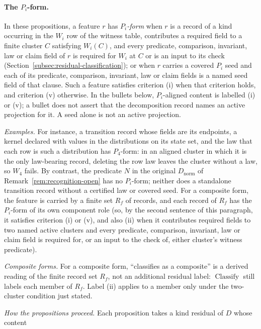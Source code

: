 \paragraph{The \(P_i\)-form.}\label{par:pi-form} In these propositions, a feature \(r\) has \emph{\(P_i\)-form} when \(r\) is a
record of a kind occurring in the \(W_i\) row of the witness table,
contributes a required field to a finite cluster \(C\) satisfying \(W_i(C)\),
and every predicate, comparison, invariant, law or claim field of \(r\) is
required for \(W_i\) at \(C\) or is an input to its check
(Section~\ref{subsec:residual-classification}); or when \(r\) carries a covered
\(P_i\) seed and each of its predicate, comparison, invariant, law or claim fields is a named seed field of that clause. Such
a feature satisfies criterion (i) when that criterion holds, and criterion (v)
otherwise. In the bullets below, \(P_i\)-aligned content is
labelled (i) or (v); a bullet does not assert that the decomposition record
names an active projection for it. A seed alone is not an active projection.
\par\emph{Examples.} For instance, a transition record whose fields are its endpoints, a kernel
declared with values in the distributions on its state set, and the law that
each row is such a distribution has \(P_4\)-form: in an aligned cluster in which it is the only law-bearing
record, deleting the row law leaves the cluster without a law, so \(W_4\)
fails. By contrast, the predicate \(N\) in the original \(D_{\mathrm{norm}}\) of
Remark~\ref{rem:recognition-open} has no \(P_i\)-form; neither does a
standalone transition record without a certified law or covered seed. For a
composite form, the feature is carried by a finite set \(R_f\) of records, and
each record of \(R_f\) has the \(P_i\)-form of its own component role (so, by
the second sentence of this paragraph, it satisfies criterion (i) or (v), and
also (ii) when it contributes required fields to two named active clusters and every
predicate, comparison, invariant, law or claim field is required for, or an
input to the check of, either cluster's witness predicate).
\par\emph{Composite forms.} For a composite form, ``classifies as a composite'' is a derived
reading of the finite record set \(R_f\), not an additional residual
label: \(\operatorname{Classify}\) still labels each member of \(R_f\).
Label (ii) applies to a member only under the two-cluster condition just
stated.
\par\emph{How the propositions proceed.} Each proposition takes a kind residual of \(D\) whose content
